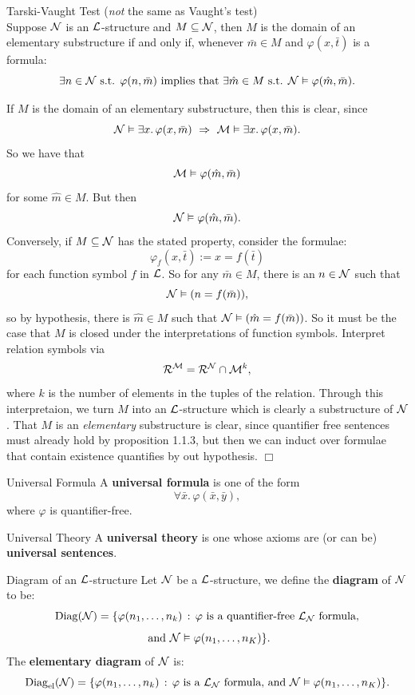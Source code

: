 \documentclass{article}
\numberwithin{thm}{subsection}
\begin{document}
\begin{fancyprop}{Tarski-Vaught Test} (\textit{not} the same as Vaught's test)\\
Suppose $\mathcal{N}$ is an $\mathcal{L}$-structure and $M \subseteq \mathcal{N}$, then $M$ is the domain of an elementary substructure if and only if, whenever $\bar{m} \in M$ and $\varphi(x,\bar{t})$ is a formula:
\[ \exists n \in \mathcal{N} \text{  s.t.  } \varphi(n,\bar{m}) \text{ \normalfont implies that  } \exists \hat{m} \in M \text{  s.t.  } \mathcal{N} \vDash \varphi(\hat{m}, \bar{m}).\]
\end{fancyprop}
\proof If $M$ is the domain of an elementary substructure, then this is clear, since \[\mathcal{N} \vDash \exists x. \, \varphi(x,\bar{m}) \, \, \Rightarrow \, \, \mathcal{M} \vDash \exists x. \, \varphi(x,\bar{m}).\] So we have that \[\mathcal{M} \vDash \varphi(\hat{m},\bar{m})\] for some $\hat{m} \in M$. But then \[
\mathcal{N} \vDash \varphi(\hat{m},\bar{m}).\]
Conversely, if $M \subseteq \mathcal{N}$ has the stated property, consider the formulae:
\[ \varphi_{f}(x,\bar{t}) := x = f(\bar{t}) \] for each function symbol $f$ in $\mathcal{L}$. So for any $\bar{m} \in M$, there is an $n \in \mathcal{N}$ such that \[
\mathcal{N} \vDash (n=f(\bar{m})),\]
so by hypothesis, there is $\hat{m} \in M$ such that $\mathcal{N} \vDash (\hat{m} = f(\bar{m}))$. So it must be the case that $M$ is closed under the interpretations of function symbols. \gap
Interpret relation symbols via \[ \mathcal{R}^{\mathcal{M}} = \mathcal{R}^{\mathcal{N}} \cap \mathcal{M}^{k},\]
where $k$ is the number of elements in the tuples of the relation. Through this interpretaion, we turn $M$ into an $\mathcal{L}$-structure which is clearly a substructure of $\mathcal{N}$.
That $M$ is an \textit{elementary} substructure is clear, since quantifier free sentences must already hold by proposition 1.1.3, but then we can induct over formulae that contain existence quantifies by out hypothesis. \flushright $\Box$ \flushleft
\begin{fancydefine}{Universal Formula} A \textbf{universal formula} is one of the form \[ \forall \bar{x}. \, \varphi(\bar{x},\bar{y}),\] where $\varphi$ is quantifier-free.
\end{fancydefine} 
\begin{fancydefine}{Universal Theory} A \textbf{universal theory} is one whose axioms are (or can be) \textbf{universal sentences}.
\end{fancydefine}
\begin{fancydefine}{Diagram of an $\mathcal{L}$-structure}
    Let $\mathcal{N}$ be a $\mathcal{L}$-structure, we define the \textbf{diagram} of $\mathcal{N}$ to be: \[\operatorname{Diag}(\mathcal{N}) = \{ \varphi(n_{1}, \dots, n_{k}) \, : \, \varphi \text{ is a quantifier-free $\mathcal{L}_{\mathcal{N}}$ formula,}\] \[\text{ and $\mathcal{N} \vDash \varphi(n_{1},\dots,n_{K})$}\}.\]
    The \textbf{elementary diagram} of $\mathcal{N}$ is:
    \[\operatorname{Diag}_{\text{el}}(\mathcal{N}) = \{ \varphi(n_{1}, \dots, n_{k}) \, : \, \varphi \text{ is a $\mathcal{L}_{\mathcal{N}}$ formula, and $\mathcal{N} \vDash \varphi(n_{1},\dots,n_{K})$}\}.\]
\end{fancydefine}
\end{document}
